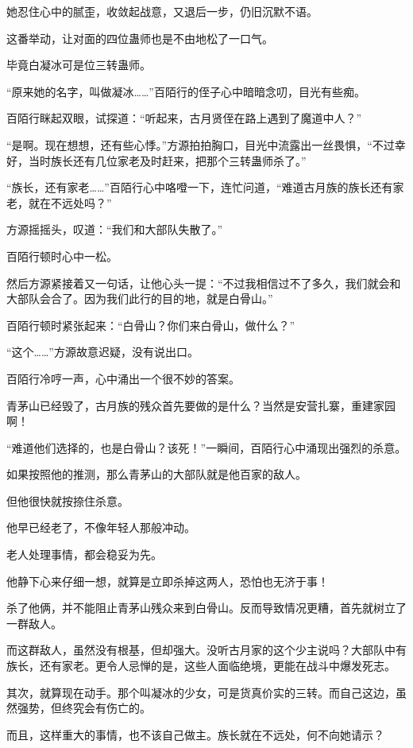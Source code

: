 \begin{this_body}
她忍住心中的腻歪，收敛起战意，又退后一步，仍旧沉默不语。

这番举动，让对面的四位蛊师也是不由地松了一口气。

毕竟白凝冰可是位三转蛊师。

“原来她的名字，叫做凝冰……”百陌行的侄子心中暗暗念叨，目光有些痴。

百陌行眯起双眼，试探道：“听起来，古月贤侄在路上遇到了魔道中人？”

“是啊。现在想想，还有些心悸。”方源拍拍胸口，目光中流露出一丝畏惧，“不过幸好，当时族长还有几位家老及时赶来，把那个三转蛊师杀了。”

“族长，还有家老……”百陌行心中咯噔一下，连忙问道，“难道古月族的族长还有家老，就在不远处吗？”

方源摇摇头，叹道：“我们和大部队失散了。”

百陌行顿时心中一松。

然后方源紧接着又一句话，让他心头一提：“不过我相信过不了多久，我们就会和大部队会合了。因为我们此行的目的地，就是白骨山。”

百陌行顿时紧张起来：“白骨山？你们来白骨山，做什么？”

“这个……”方源故意迟疑，没有说出口。

百陌行冷哼一声，心中涌出一个很不妙的答案。

青茅山已经毁了，古月族的残众首先要做的是什么？当然是安营扎寨，重建家园啊！

“难道他们选择的，也是白骨山？该死！”一瞬间，百陌行心中涌现出强烈的杀意。

如果按照他的推测，那么青茅山的大部队就是他百家的敌人。

但他很快就按捺住杀意。

他早已经老了，不像年轻人那般冲动。

老人处理事情，都会稳妥为先。

他静下心来仔细一想，就算是立即杀掉这两人，恐怕也无济于事！

杀了他俩，并不能阻止青茅山残众来到白骨山。反而导致情况更糟，首先就树立了一群敌人。

而这群敌人，虽然没有根基，但却强大。没听古月家的这个少主说吗？大部队中有族长，还有家老。更令人忌惮的是，这些人面临绝境，更能在战斗中爆发死志。

其次，就算现在动手。那个叫凝冰的少女，可是货真价实的三转。而自己这边，虽然强势，但终究会有伤亡的。

而且，这样重大的事情，也不该自己做主。族长就在不远处，何不向她请示？


\end{this_body}
